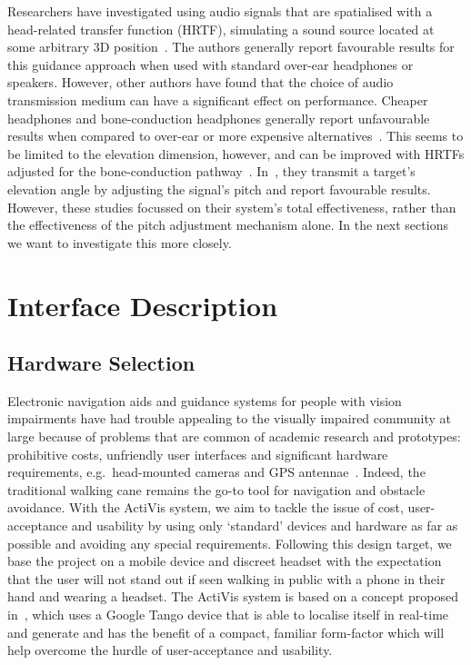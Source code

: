 \documentclass{llncs}
\begin{document}
Researchers have investigated using audio signals that are spatialised with a head-related transfer function (HRTF), simulating a sound source located at some arbitrary 3D position~\cite{geronazzo2016interactive,wilson2007swan,katz2010navig,blum2013spatialized}.
The authors generally report favourable results for this guidance approach when used with standard over-ear headphones or speakers. 
However, other authors have found that the choice of audio transmission medium can have a significant effect on performance.
Cheaper headphones and bone-conduction headphones generally report unfavourable results when compared to over-ear or more expensive alternatives~\cite{schonstein2008comparison,macdonald2006spatial,stanley2006lateralization}. 
This seems to be limited to the elevation dimension, however, and can be improved with HRTFs adjusted for the bone-conduction pathway~\cite{stanley2006lateralization}.
In~\cite{durette2008visuo}, they transmit a target's elevation angle by adjusting the signal's pitch and report favourable results. 
However, these studies focussed on their system's total effectiveness, rather than the effectiveness of the pitch adjustment mechanism alone. In the next sections we want to investigate this more closely. 

\section{Interface Description}\label{sec:interface-design}

\subsection{Hardware Selection}

Electronic navigation aids and guidance systems for people with vision impairments have had trouble appealing to the visually impaired community at large because of problems that are common of academic research and prototypes: prohibitive costs, unfriendly user interfaces and significant hardware requirements, e.g.\ head-mounted cameras and GPS antennae~\cite{golledge2004stated,yusif2016older,arditi2013user}.
Indeed, the traditional walking cane remains the go-to tool for navigation and obstacle avoidance. 
With the ActiVis system, we aim to tackle the issue of cost, user-acceptance and usability by using only `standard' devices and hardware as far as possible and avoiding any special requirements.
Following this design target, we base the project on a mobile device and discreet headset with the expectation that the user will not stand out if seen walking in public with a phone in their hand and wearing a headset.
The ActiVis system is based on a concept proposed in~\cite{bellotto2013multimodal,lock2017portable}, which uses a Google Tango device that is able to localise itself in real-time and generate and has the benefit of a compact, familiar form-factor which will help overcome the hurdle of user-acceptance and usability.
\end{document}
